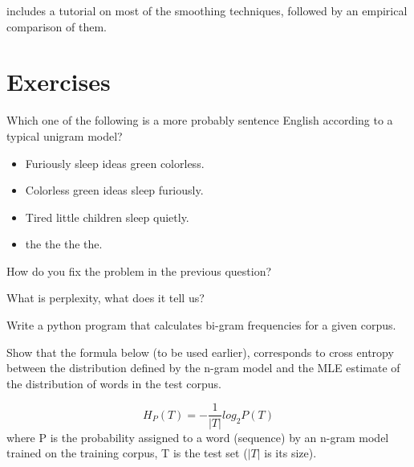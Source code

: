\textcite{chen1998} includes a tutorial on most of the smoothing techniques,
followed by an empirical comparison of them.

\section*{Exercises}

\begin{question}
  Which one of the following is a more probably sentence English according to a typical unigram model?
  \begin{itemize}
    \item Furiously sleep ideas green colorless.
    \item Colorless green ideas sleep furiously.
    \item Tired little children sleep quietly. 
    \item the the the the.
  \end{itemize}
\end{question}

\begin{question}
  How do you fix the problem in the previous question?
\end{question}

\begin{question}
  What is perplexity, what does it tell us?
\end{question}

\begin{question}
  Write a python program that calculates bi-gram frequencies for a given corpus.
\end{question}

\begin{question}
  Show that the formula below (to be used earlier),
  corresponds to cross entropy between the distribution defined
  by the n-gram model
  and the MLE estimate of the distribution of words
  in the test corpus.

  \[
    H_{P}(T) = - \frac{1}{\lvert{}T\rvert{}}log_{2}P(T)
  \]
  where P is the probability assigned to a word (sequence)
  by an n-gram model trained on the training corpus,
  T is the test set ($\lvert{}T\rvert{}$ is its size).

\end{question}
